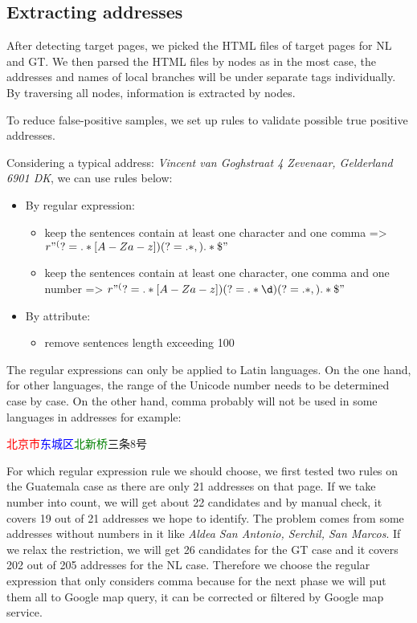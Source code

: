 \documentclass[sigchi]{acmart}
\begin{document}
\subsection{Extracting addresses}
After detecting target pages, we picked the HTML files of target pages for NL and GT. We then parsed the HTML files by nodes as in the most case, the addresses and names of local branches will be under separate tags individually. By traversing all nodes, information is extracted by nodes.

To reduce false-positive samples, we set up rules to validate possible true positive addresses.

Considering a typical address: \textit{Vincent van Goghstraat 4 Zevenaar, Gelderland 6901 DK}, we can use rules below:
\begin{itemize}
    \item By regular expression: 
        \begin{itemize}
            \item keep the sentences contain at least one character and one comma => $r"^(?=.*[A-Za-z])(?=.*,).*\$"$
            \item  keep the sentences contain at least one character, one comma and one number => $r"^(?=.*[A-Za-z])(?=.*\d)(?=.*,).*\$"$
        \end{itemize}
    \item By attribute:
        \begin{itemize}
            \item remove sentences length exceeding 100
        \end{itemize}
\end{itemize}


The regular expressions can only be applied to Latin languages. 
On the one hand, for other languages, the range of the Unicode number needs to be determined case by case.
On the other hand, comma probably will not be used in some languages in addresses for example:\begin{CJK*}{UTF8}{gbsn}
\textcolor{red}{北京市}\textcolor{blue}{东城区}\textcolor{green}{北新桥}三条8号
\end{CJK*}


For which regular expression rule we should choose, we first tested two rules on the Guatemala case as there are only 21 addresses on that page.
If we take number into count, we will get about 22 candidates and by manual check, it covers 19 out of 21 addresses we hope to identify. The problem comes from some addresses without numbers in it like \textit{Aldea San Antonio, Serchil, San Marcos}.
If we relax the restriction, we will get 26 candidates for the GT case and it covers 202 out of 205 addresses for the NL case.
Therefore we choose the regular expression that only considers comma because for the next phase we will put them all to Google map query, it can be corrected or filtered by Google map service.
\end{document}
